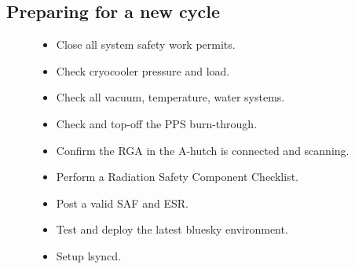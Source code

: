 \documentclass[letterpaper,10pt,english]{sphinxmanual}
\begin{document}
\subsection{Preparing for a new cycle}
\label{\detokenize{staff:preparing-for-a-new-cycle}}\begin{description}
\item[{}] \leavevmode\begin{itemize}
\item {} 
Close all system safety work permits.

\item {} 
Check cryocooler pressure and load.

\item {} 
Check all vacuum, temperature, water systems.

\item {} 
Check and top-off the PPS burn-through.

\item {} 
Confirm the RGA in the A-hutch is connected and scanning.

\item {} 
Perform a Radiation Safety Component Checklist.

\item {} 
Post a valid SAF and ESR.

\item {} 
Test and deploy the latest bluesky environment.

\item {} 
Setup lsyncd.

\end{itemize}

\end{description}
\end{document}
